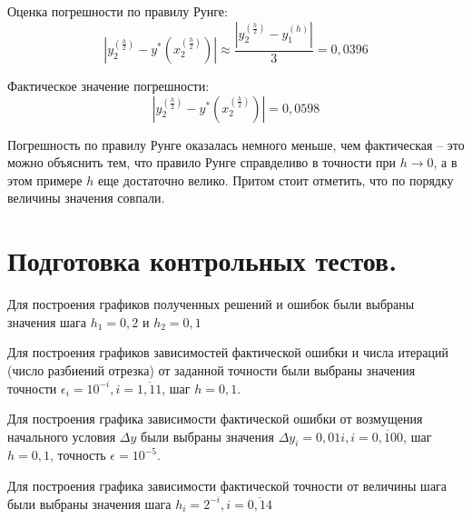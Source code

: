\documentclass[a4paper, 12pt]{article}
\begin{document}
	Оценка погрешности по правилу Рунге:
	\begin{equation*}
		|y_2^{(\frac{h}{2})}-y^*(x_2^{(\frac{h}{2})})|\approx\frac{|y_2^{(\frac{h}{2})}-y_1^{(h)}|}{3}=0,0396
	\end{equation*}
	
	Фактическое значение погрешности:
	\begin{equation*}
		|y_2^{(\frac{h}{2})}-y^*(x_2^{(\frac{h}{2})})|=0,0598
	\end{equation*}

	Погрешность по правилу Рунге оказалась немного меньше, чем фактическая -- это можно объяснить тем, что правило Рунге справделиво в точности при $h\rightarrow0$, а в этом примере $h$ еще достаточно велико. Притом стоит отметить, что по порядку величины значения совпали.
	
	\section{Подготовка контрольных тестов.}
	
	Для построения графиков полученных решений и ошибок были выбраны значения шага $h_1=0,2$ и $h_2=0,1$
	
	Для построения графиков зависимостей фактической ошибки и числа итераций (число разбиений отрезка) от заданной точности были выбраны значения точности $\epsilon_i=10^{-i}, i=\overline{1,11}$, шаг $h=0,1$. 
	
	Для построения графика зависимости фактической ошибки от возмущения начального условия $\Delta y$ были выбраны значения $\Delta y_i=0,01i, i=\overline{0,100}$, шаг $h=0,1$, точность $\epsilon=10^{-5}$.
	
	Для построения графика зависимости фактической точности от величины шага были выбраны значения шага $h_i=2^{-i}, i=\overline{0,14}$
	
\end{document}
